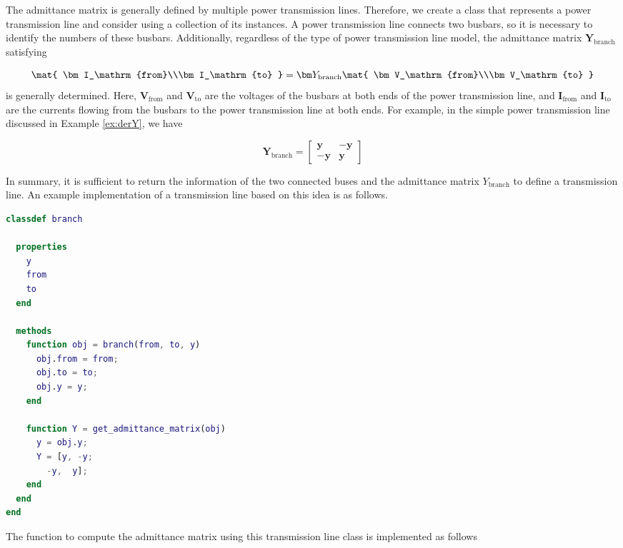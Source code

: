 \documentclass[graybox, envcountchap]{svmult}
\begin{document}
\begin{example}

The admittance matrix is generally defined by multiple power transmission lines.
Therefore, we create a class that represents a power transmission line and
consider using a collection of its instances. A power transmission line connects
two busbars, so it is necessary to identify the numbers of these busbars.
Additionally, regardless of the type of power transmission line model, the
admittance matrix $\bm Y_\mathrm{branch}$ satisfying

\begin{equation}
  \mat{
    \bm I_\mathrm{from}\\\bm I_\mathrm{to}
  } =
  \bm Y_\mathrm{branch}
  \mat{
    \bm V_\mathrm{from}\\\bm V_\mathrm{to}
  }
\end{equation}
is generally determined. Here, $\bm V_\mathrm{from}$ and $\bm V_\mathrm{to}$ are
the voltages of the busbars at both ends of the power transmission line, and
$\bm I_\mathrm{from}$ and $\bm I_\mathrm{to}$ are the currents flowing from the
busbars to the power transmission line at both ends. For example, in the simple
power transmission line discussed in Example \ref{ex:derY}, we have

\[
  \bm Y_\mathrm{branch} = \begin{bmatrix}
    \bm y & -\bm y\\
    -\bm y & \bm y
  \end{bmatrix}
\]

In summary, it is sufficient to return the information of the two connected
buses and the admittance matrix $Y_\mathrm{branch}$ to define a transmission
line. An example implementation of a transmission line based on this idea is as
follows.

\begin{lstlisting}[language=Matlab, caption=branch.m, label={program:branch}]
classdef branch
  
  properties
    y
    from
    to
  end
  
  methods
    function obj = branch(from, to, y)
      obj.from = from;
      obj.to = to;
      obj.y = y;
    end
    
    function Y = get_admittance_matrix(obj)
      y = obj.y;
      Y = [y, -y;
        -y,  y];
    end
  end
end
\end{lstlisting}

The function to compute the admittance matrix using this transmission line class
is implemented as follows


\end{example}
\end{document}
